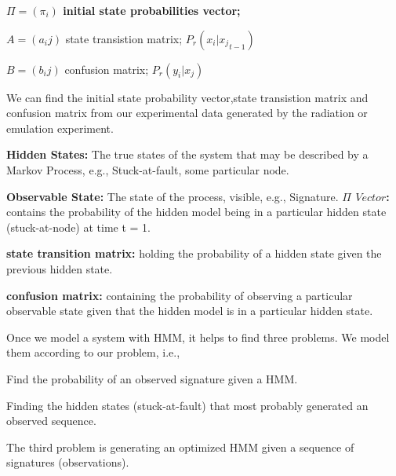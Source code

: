 \textbf{$\Pi = (\pi_i)$ initial state probabilities vector;}




$A = (a_ij)$ state transistion matrix;  \hspace{0.3cm} $P_r(x_i | {x_j}_{t-1})$

$B = (b_ij)$ confusion matrix;     \hspace{0.3cm}        $P_r(y_i | x_j)$


We can find the initial state probability vector,state transistion matrix and confusion matrix  from our experimental data generated by the radiation or emulation experiment.

\textbf{Hidden States:} The true states of the system that may be described by a Markov Process, e.g., Stuck-at-fault, some particular node.

\textbf{Observable State:} The state of the process, visible, e.g., Signature.
\textbf{$\Pi$ $Vector$:} contains the probability of the hidden model being in a particular hidden state (stuck-at-node) at time t = 1.

\textbf{state transition matrix:}  holding the probability of a hidden state given the previous hidden state.

\textbf{confusion matrix:} containing the probability of observing a particular observable state given that the hidden model is in a particular hidden state. 



Once we model a system with HMM, it helps to find three problems. We model them according to our problem, i.e.,

\begin{tcolorbox}[width=\textwidth,colback={gray},title={Evaluation },colbacktitle=gray,coltitle=black]  

Find the probability of an observed signature given a HMM.  
\end{tcolorbox}


\begin{tcolorbox}[width=\textwidth,colback={gray},title={Decoding },colbacktitle=gray,coltitle=black]  

Finding the hidden states (stuck-at-fault) that most probably generated an observed sequence. 
\end{tcolorbox}

\begin{tcolorbox}[width=\textwidth,colback={gray},title={Learning },colbacktitle=gray,coltitle=black]  

The third problem is generating an optimized HMM given a sequence of signatures (observations).
\end{tcolorbox}



